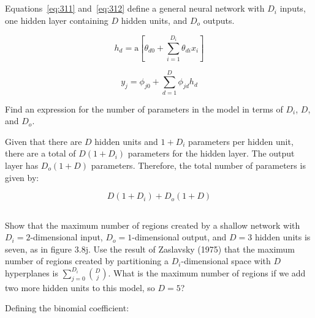 \documentclass[12pt]{report}
\begin{document}
\newpage

\subsection{}
\begin{mdframed}
    Equations~\eqref{eq:311} and~\eqref{eq:312} define a general neural network with $D_{i}$ inputs, one hidden layer containing $D$ hidden units, and $D_{o}$ outputs.

    \begin{equation}
        h_{d} = \text{a}\left[ \theta_{d0} + \sum_{i=1}^{D_{i}} \theta_{di}x_{i} \right]
        \label{eq:311}
        \tag{3.11}
    \end{equation}

    \begin{equation}
        y_{j} = \phi_{j0} + \sum_{d=1}^{D} \phi_{jd}h_{d}
        \label{eq:312}
        \tag{3.12}
    \end{equation}

    Find an expression for the number of parameters in the model in terms of $D_{i}$, $D$, and $D_{o}$.
\end{mdframed}

Given that there are $D$ hidden units and $1 + D_{i}$ parameters per hidden unit, there are a total of $D(1 + D_{i})$ parameters for the hidden layer. The output layer has $D_{o}(1 + D)$ parameters. Therefore, the total number of parameters is given by:

\begin{equation*}
    D(1 + D_{i}) + D_{o}(1 + D)
\end{equation*}



\subsection{}
\begin{mdframed}
    Show that the maximum number of regions created by a shallow network with $D_{i} =2$-dimensional input, $D_{o} = 1$-dimensional output, and $D=3$ hidden units is seven, as in figure 3.8j. Use the result of Zaslavsky (1975) that the maximum number of regions created by partitioning a $D_{i}$-dimensional space with $D$ hyperplanes is $\sum_{j=0}^{D_{i}} \binom{D}{j}$. What is the maximum number of regions if we add two more hidden units to this model, so $D=5$?
\end{mdframed}

Defining the binomial coefficient:
\end{document}
